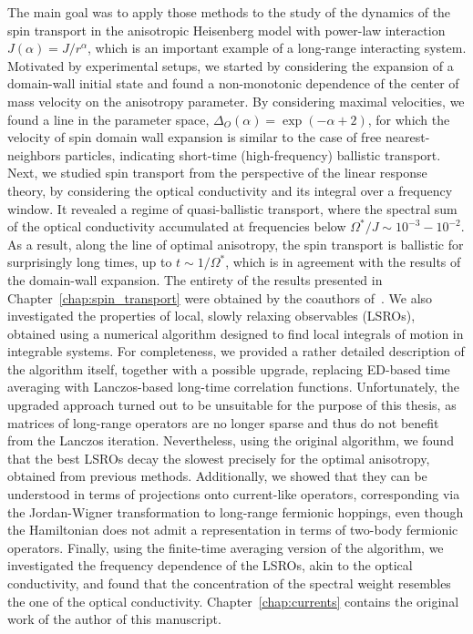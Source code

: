 The main goal was to apply those methods to the study of the dynamics of the spin transport in the anisotropic
Heisenberg model with power-law interaction \(J(\alpha) = J/r^{\alpha}\), which is an important example of a
long-range interacting system. Motivated by experimental setups, we started by considering the
expansion of a domain-wall initial state and found a non-monotonic dependence of the
center of mass velocity on the anisotropy parameter. By considering maximal velocities,
we found a line in the parameter space, \(\Delta_O(\alpha) = \exp(-\alpha + 2)\),
for which the velocity of spin domain wall expansion is similar to the case of free
nearest-neighbors particles, indicating short-time (high-frequency) ballistic transport.
Next, we studied spin transport from the perspective of the linear response theory,
by considering the optical conductivity and its integral over a frequency window.
It revealed a regime of quasi-ballistic transport, where the spectral sum
of the optical conductivity accumulated at frequencies below \(\Omega^{\ast}/J \sim
10^{-3}-10^{-2}\). As a result, along the line of optimal anisotropy, the spin
transport is ballistic for surprisingly long times, up to \(t \sim 1/\Omega^{\ast}\),
which is in agreement with the results of the domain-wall expansion. The entirety of
the results presented in Chapter~\ref{chap:spin_transport} were obtained by the coauthors of~\textcite{Mierzejewski2023}.
We also investigated the properties of local, slowly relaxing observables
(LSROs), obtained using a numerical algorithm designed to find local integrals of
motion in integrable systems. For completeness, we provided a rather detailed
description of the algorithm itself, together with a possible upgrade, replacing
ED-based time averaging with Lanczos-based long-time correlation functions.
Unfortunately, the upgraded approach turned out to be unsuitable for the purpose of
this thesis, as matrices of long-range operators are no longer sparse and thus do not
benefit from the Lanczos iteration. Nevertheless, using the original algorithm, we
found that the best LSROs decay the slowest precisely for the optimal anisotropy, obtained from
previous methods. Additionally, we showed that they can be understood in terms of projections onto
current-like operators, corresponding via the Jordan-Wigner transformation to long-range fermionic hoppings,
even though the Hamiltonian does not admit a representation in terms of two-body fermionic operators.
Finally, using the finite-time averaging version of the algorithm, we investigated the frequency dependence
of the LSROs, akin to the optical conductivity, and found that the concentration of the spectral weight
resembles the one of the optical conductivity. Chapter~\ref{chap:currents} contains the original work
of the author of this manuscript.


